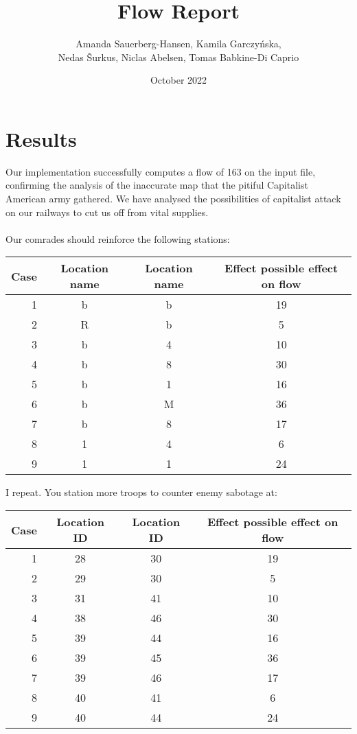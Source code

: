 \documentclass{article}
\title{Flow Report}
\author{Amanda Sauerberg-Hansen, Kamila Garczyńska, \\Nedas Šurkus, Niclas Abelsen, Tomas Babkine-Di Caprio}
\date{October 2022}
\begin{document}
  \maketitle

  \section{Results}

  Our implementation successfully computes a flow of 163 on the input file, confirming the analysis of the inaccurate map that the pitiful Capitalist American army gathered. We have analysed the possibilities of capitalist attack on our railways to cut us off from vital supplies.\\\\
  Our comrades should reinforce the following stations:
  \begin{center}
\bigskip
  \begin{tabular}{rccc}\toprule
    Case & Location name & Location name & Effect possible effect on flow \\\midrule
     1& b &  b &  19 \\
     2& R &  b &  5 \\
     3& b &  4 &  10 \\
     4& b &  8 &  30 \\
     5& b &  1 &  16 \\
     6& b &  M &  36 \\
     7& b &  8 &  17 \\
     8& 1 &  4 &  6 \\
     9& 1 &  1 &  24 \\
  \end{tabular}
  \bigskip
  \end{center}
  I repeat. You station more troops to counter enemy sabotage at: 
  \begin{center}
  \bigskip
  \begin{tabular}{rccc}\toprule
    Case & Location ID & Location ID & Effect possible effect on flow \\\midrule
    1& 28& 30& 19 \\
    2& 29& 30& 5 \\
    3& 31& 41& 10 \\
    4& 38& 46& 30 \\
    5& 39& 44& 16 \\
    6& 39& 45& 36 \\
    7& 39& 46& 17 \\
    8& 40& 41& 6 \\
    9& 40& 44& 24 \\
  \end{tabular}
  \bigskip
  \end{center}
\newpage
\end{document}
